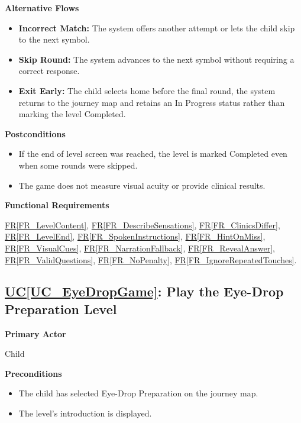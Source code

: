 \documentclass[12pt]{article}
\newcounter{ucnum} %
\newcommand{\ucref}[1]{\hyperref[#1]{UC\ref*{#1}}}
\newcommand{\rref}[1]{\hyperref[#1]{FR\ref*{#1}}}
\begin{document}
\textbf{Alternative Flows}
\begin{itemize}
    \item \textbf{Incorrect Match:} The system offers another attempt
    or lets the child skip to the next symbol.
    \item \textbf{Skip Round:} The system advances to the next symbol
    without requiring a correct response.
    \item \textbf{Exit Early:} The child selects home before the final
    round, the system returns to the journey map and retains an
    In Progress status rather than marking the level Completed.
\end{itemize}

\textbf{Postconditions}
\begin{itemize}
    \item If the end of level screen was reached, the level is
    marked Completed even when some rounds were skipped.
    \item The game does not measure visual acuity or provide
    clinical results.
\end{itemize}

\textbf{Functional Requirements}

\rref{FR_LevelContent}, \rref{FR_DescribeSensations}, \rref{FR_ClinicsDiffer}, \rref{FR_LevelEnd}, \rref{FR_SpokenInstructions}, \rref{FR_HintOnMiss}, \rref{FR_VisualCues}, \rref{FR_NarrationFallback}, \rref{FR_RevealAnswer}, \rref{FR_ValidQuestions}, \rref{FR_NoPenalty}, \rref{FR_IgnoreRepeatedTouches}.

\label{UC_EyeDropGame}
\subsection{\ucref{UC_EyeDropGame}: Play the Eye-Drop Preparation Level}

\textbf{Primary Actor}

Child

\textbf{Preconditions}
\begin{itemize}
    \item The child has selected Eye-Drop Preparation on the journey map.
    \item The level's introduction is displayed.
\end{itemize}
\end{document}
